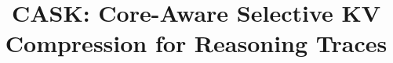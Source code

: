 \documentclass{article}
\title{CASK: Core-Aware Selective KV Compression for Reasoning Traces}
\author{\CASKAuthorBlock}
\begin{document}
\maketitle





\CASKChecklistBlock
\end{document}
